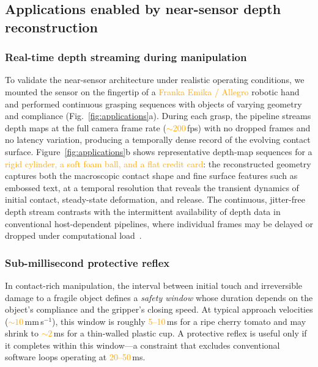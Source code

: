 \documentclass[10pt,a4paper]{article}
\newcommand{\placeholder}[1]{\textcolor{orange}{#1}}
\begin{document}
\subsection*{Applications enabled by near-sensor depth reconstruction}

\subsubsection*{Real-time depth streaming during manipulation}

To validate the near-sensor architecture under realistic operating conditions, we mounted the sensor on the fingertip of a \placeholder{Franka Emika / Allegro} robotic hand and performed continuous grasping sequences with objects of varying geometry and compliance (Fig.~\ref{fig:applications}a). During each grasp, the pipeline streams depth maps at the full camera frame rate (\placeholder{${\sim}200$}\,fps) with no dropped frames and no latency variation, producing a temporally dense record of the evolving contact surface. Figure~\ref{fig:applications}b shows representative depth-map sequences for a \placeholder{rigid cylinder, a soft foam ball, and a flat credit card}: the reconstructed geometry captures both the macroscopic contact shape and fine surface features such as embossed text, at a temporal resolution that reveals the transient dynamics of initial contact, 
steady-state deformation, and release. The continuous, jitter-free depth stream contrasts with the intermittent availability of depth data in conventional host-dependent pipelines, where individual frames may be delayed or dropped under computational load~\cite{lambeta2020digit}.

\subsubsection*{Sub-millisecond protective reflex}

In contact-rich manipulation, the interval between initial touch and irreversible damage to a fragile object defines a \emph{safety window} whose duration depends on the object's compliance and the gripper's closing speed. At typical approach velocities (\placeholder{${\sim}10$}\,mm\,s$^{-1}$), this window is roughly \placeholder{5--10}\,ms for a ripe cherry tomato and may shrink to \placeholder{${\sim}2$}\,ms for a thin-walled plastic cup. A protective reflex is useful only if it completes within this window---a constraint that excludes conventional software loops operating at \placeholder{20--50}\,ms.
\end{document}
